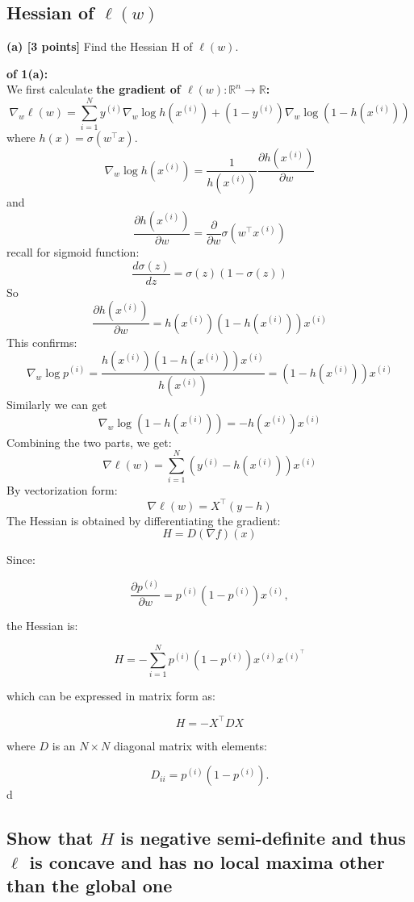 \documentclass[lang=cn,11pt]{elegantbook}
\begin{document}
\subsection{Hessian of $\ell(w)$}
\textbf{(a) [3 points]} Find the Hessian H of $\ell(w)$.
\begin{solution}
    \textbf{of 1(a):}\\
    We first calculate \textbf{the gradient of $\ell(w):\mathbb{R}^n\rightarrow \mathbb{R}$:}
\[
\nabla_w \ell(w) = \sum_{i=1}^{N} y^{(i)}\nabla_w \log h(x^{(i)}) +  (1 - y^{(i)})\nabla_w \log (1 - h(x^{(i)})) 
\]
where \( h(x) = \sigma(w^\top x) \). 
\[
\nabla_w \log h(x^{(i)}) = \frac{1}{h(x^{(i)})} \frac{\partial h(x^{(i)})}{\partial w}
\]
and
\[
\frac{\partial h(x^{(i)})}{\partial w} = \frac{\partial}{\partial w} \sigma(w^\top x^{(i)})
\]
recall for sigmoid function:
\[
\frac{d\sigma(z)}{dz} = \sigma(z)(1 - \sigma(z))
\]
So
\[
\frac{\partial  h(x^{(i)})}{\partial w} =  h(x^{(i)}) (1 - h(x^{(i)})) x^{(i)}
\]
This confirms:
\[
\nabla_w \log p^{(i)} = \frac{h(x^{(i)}) (1 - h(x^{(i)})) x^{(i)}}{h(x^{(i)})}
= (1 - h(x^{(i)})) x^{(i)}
\]
Similarly we can get
\[
\nabla_w\log (1 - h(x^{(i)})) = -h(x^{(i)}) x^{(i)}
\]Combining the two parts, we get:
\[
\nabla \ell(w) = \sum_{i=1}^{N} (y^{(i)} - h(x^{(i)})) x^{(i)}
\]
By vectorization form: \[
\nabla \ell(w) = X^\top (y - h)
\]
The Hessian is obtained by differentiating the gradient:
\[
H = D(\nabla f)(x) 
\]

Since:

\[
\frac{\partial p^{(i)}}{\partial w} = p^{(i)} (1 - p^{(i)}) x^{(i)},
\]

the Hessian is:

\[
H = -\sum_{i=1}^{N} p^{(i)} (1 - p^{(i)}) x^{(i)} x^{(i)^\top}
\]

which can be expressed in matrix form as:

\[
H = - X^\top D X
\]

where \( D \) is an \( N \times N \) diagonal matrix with elements:

\[
D_{ii} = p^{(i)} (1 - p^{(i)}).
\]
d
    
\end{solution}




\subsection{Show that $H$ is negative semi-definite and thus $\ell$ is concave and has no local maxima other than the global one}
\end{document}
